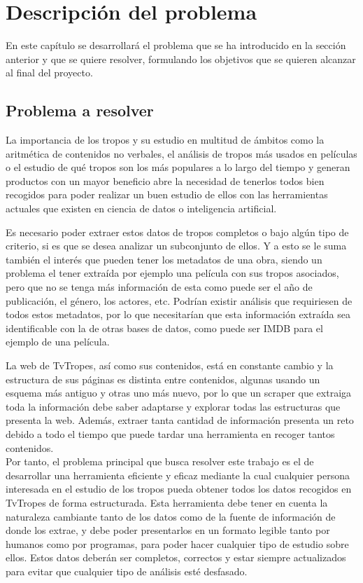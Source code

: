 \chapter{Descripción del problema}

En este capítulo se desarrollará el problema que se ha introducido en la sección anterior y que se quiere resolver, formulando los objetivos que se quieren alcanzar al final del proyecto.

\section{Problema a resolver}

La importancia de los tropos y su estudio en multitud de ámbitos como la aritmética de contenidos no verbales, el análisis de tropos más usados en películas o el estudio de qué tropos son los más populares a lo largo del tiempo y generan productos con un mayor beneficio abre la necesidad de tenerlos todos bien recogidos para poder realizar un buen estudio de ellos con las herramientas actuales que existen en ciencia de datos o inteligencia artificial. 

Es necesario poder extraer estos datos de tropos completos o bajo algún tipo de criterio, si es que se desea analizar un subconjunto de ellos. Y a esto se le suma también el interés que pueden tener los metadatos de una obra, siendo un problema el tener extraída por ejemplo una película con sus tropos asociados, pero que no se tenga más información de esta como puede ser el año de publicación, el género, los actores, etc. Podrían existir análisis que requiriesen de todos estos metadatos, por lo que necesitarían que esta información extraída sea identificable con la de otras bases de datos, como puede ser IMDB \cite{imdb} para el ejemplo de una película.

La web de TvTropes, así como sus contenidos, está en constante cambio y la estructura de sus páginas es distinta entre contenidos, algunas usando un esquema más antiguo y otras uno más nuevo, por lo que un scraper que extraiga toda la información debe saber adaptarse y explorar todas las estructuras que presenta la web. Además, extraer tanta cantidad de información presenta un reto debido a todo el tiempo que puede tardar una herramienta en recoger tantos contenidos.\\

Por tanto, el problema principal que busca resolver este trabajo es el de desarrollar una herramienta eficiente y eficaz mediante la cual cualquier persona interesada en el estudio de los tropos pueda obtener todos los datos recogidos en TvTropes de forma estructurada. Esta herramienta debe tener en cuenta la naturaleza cambiante tanto de los datos como de la fuente de información de donde los extrae, y debe poder presentarlos en un formato legible tanto por humanos como por programas, para poder hacer cualquier tipo de estudio sobre ellos. Estos datos deberán ser completos, correctos y estar siempre actualizados para evitar que cualquier tipo de análisis esté desfasado.\\

